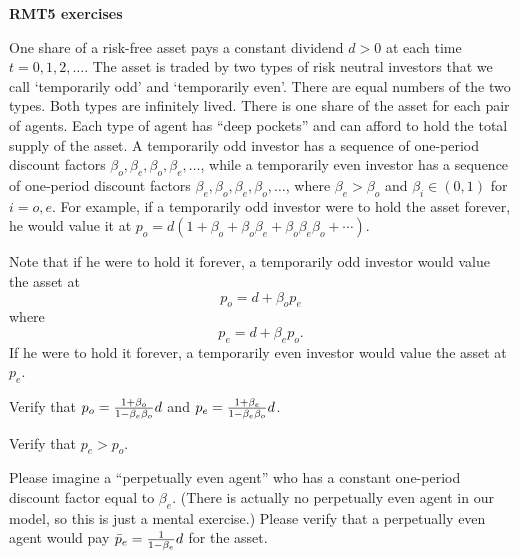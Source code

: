 

\book
\overfullrule=0pt
\def\frac#1#2{#1\over #2}
%
\def\bmatrix#1{\left[ \matrix{#1} \right]}
\def\be{{\beta}}
\def\toone{{t+1}}

\overfullrule=0pt

\centerline{\bf RMT5 exercises}
\medskip



 
\medskip

\noindent One share of a risk-free asset pays a constant dividend $d >0$ at each time $t = 0, 1, 2, \ldots$.
The asset is traded by two types of risk neutral investors that we call  `temporarily odd' and `temporarily even'. There are equal numbers of the two types.
Both types are infinitely lived.  There is one share of the asset for each pair of agents.  Each type of agent has ``deep pockets'' and can afford to hold the total supply of the asset.
A temporarily odd investor
has a sequence of one-period discount factors $\beta_o, \beta_e, \beta_o, \beta_e, \ldots $, while a temporarily  even investor
has a sequence of one-period discount factors   $\beta_e, \beta_o, \beta_e,  \beta_o, \ldots $, where $\beta_e > \beta_o$
and $\beta_i \in (0,1)$ for $i=o, e$. For example, if a temporarily odd investor were to hold the asset forever, he would value
it at $p_o = d( 1 + \beta_o + \beta_o \beta_e + \beta_o \beta_e \beta_o + \cdots )$.

\medskip
{}

\medskip
\noindent   Note that if he were to hold it forever, a temporarily odd investor would value the asset at
$$ p_o = d + \beta_o p_e$$
where
$$ p_e = d + \beta_e p_o .$$
If he were to hold it forever, a temporarily even investor would value the asset at
$p_e$.

\medskip
{} Verify that $p_o = {\frac{1 + \beta_o}{1-\beta_e \beta_o}} d $ and
$ p_e = {\frac{1 + \beta_e}{1-\beta_e \beta_o}} d $.

\medskip
{} Verify that $p_e > p_o$.


\medskip
{} Please imagine a  ``perpetually even agent'' who has a constant one-period discount factor equal to
$\beta_e$.  (There is actually no perpetually even agent in our model, so this is just a mental exercise.)  Please verify
that a perpetually even agent would pay $\bar p_e = {\frac{1}{1-\beta_e}}d $ for the asset.



